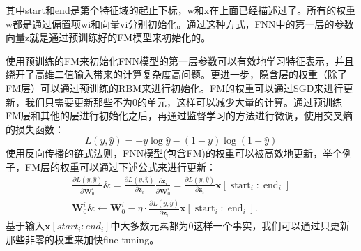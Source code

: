 \documentclass[12pt,a4paper]{ctexart}
\begin{document}
其中start和end是第个特征域的起止下标，w和x在上面已经描述过了。所有的权重w都是通过偏置项wi和向量vi分别初始化。通过这种方式，FNN中的第一层的参数向量z就是通过预训练好的FM模型来初始化的。\par
使用预训练的FM来初始化FNN模型的第一层参数可以有效地学习特征表示，并且绕开了高维二值输入带来的计算复杂度高问题。更进一步，隐含层的权重（除了FM层）可以通过预训练的RBM来进行初始化。FM的权重可以通过SGD来进行更新，我们只需要更新那些不为0的单元，这样可以减少大量的计算。通过预训练FM层和其他的层进行初始化之后，再通过监督学习的方法进行微调，使用交叉熵的损失函数：
\begin{equation}
L(y, \hat{y})=-y \log \hat{y}-(1-y) \log (1-\hat{y})
\end{equation}
使用反向传播的链式法则，FNN模型(包含FM)的权重可以被高效地更新，举个例子，FM层的权重可以通过下述公式来进行更新：
\begin{equation}
\begin{aligned}
\frac{\partial L(y, \hat{y})}{\partial \boldsymbol{W}_{0}^{i}} \&=\frac{\partial L(y, \hat{y})}{\partial \boldsymbol{z}_{i}} \frac{\partial \boldsymbol{z}_{i}}{\partial \boldsymbol{W}_{0}^{i}}=\frac{\partial L(y, \hat{y})}{\partial \boldsymbol{z}_{i}} \boldsymbol{x}\left[\operatorname{start}_{i}: \operatorname{end}_{i}\right] \\
\boldsymbol{W}_{0}^{i} \& \leftarrow \boldsymbol{W}_{0}^{i}-\eta \cdot \frac{\partial L(y, \hat{y})}{\partial \boldsymbol{z}_{i}} \boldsymbol{x}\left[\operatorname{start}_{i}: \operatorname{end}_{i}\right] .
\end{aligned}
\end{equation}
基于输入$\boldsymbol{x}\left[\right. start _{i}: end \left._{i}\right]$中大多数元素都为0这样一个事实，我们可以通过只更新那些非零的权重来加快fine-tuning。\par
\end{document}
